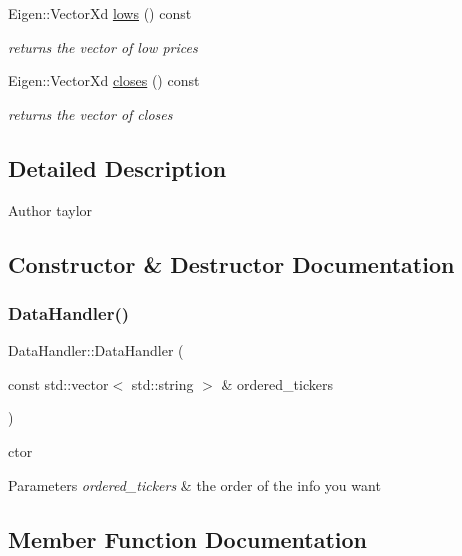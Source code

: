 \begin{DoxyCompactItemize}
Eigen\+::\+Vector\+Xd \hyperlink{classDataHandler_ad0b44f8a121372a519922feea6dd02e4}{lows} () const
\begin{DoxyCompactList}\small\item\em returns the vector of low prices \end{DoxyCompactList}\item 
Eigen\+::\+Vector\+Xd \hyperlink{classDataHandler_a18f429318b33936acaff563835729e1c}{closes} () const
\begin{DoxyCompactList}\small\item\em returns the vector of closes \end{DoxyCompactList}\end{DoxyCompactItemize}


\subsection{Detailed Description}
\begin{DoxyAuthor}{Author}
taylor 
\end{DoxyAuthor}


\subsection{Constructor \& Destructor Documentation}
\mbox{\label{classDataHandler_a754e8043d3c0249833f9bf47dcfff4cd}} 
\subsubsection{\texorpdfstring{Data\+Handler()}{DataHandler()}}
{\footnotesize\ttfamily Data\+Handler\+::\+Data\+Handler (\begin{DoxyParamCaption}\item[{const std\+::vector$<$ std\+::string $>$ \&}]{ordered\+\_\+tickers }\end{DoxyParamCaption})}



ctor 


\begin{DoxyParams}{Parameters}
{\em ordered\+\_\+tickers} & the order of the info you want \\
\hline
\end{DoxyParams}


\subsection{Member Function Documentation}
\mbox{\label{classDataHandler_a18f429318b33936acaff563835729e1c}} 
